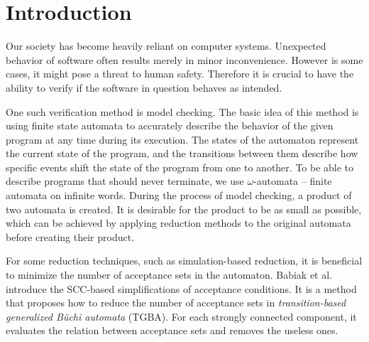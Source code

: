 \documentclass[
  digital, %
  twoside, %
  table,   %
  lof,     %
  lot,     %
]{fithesis3}
\begin{document}

\newcommand{\accmarkblue}{\begin{tikzpicture} \node[accset, collacc0] {}; \end{tikzpicture}}
\newcommand{\accmarkmag}{\begin{tikzpicture} \node[accset, collacc1] {}; \end{tikzpicture}}
\newcommand{\accmarkor}{\begin{tikzpicture} \node[accset, collacc2] {}; \end{tikzpicture}}
\newcommand{\accsquare}{\begin{tikzpicture} \node[accset, collacc0] {}; \end{tikzpicture}}

\chapter{Introduction}
Our society has become heavily reliant on computer systems. Unexpected behavior of software often results merely in minor inconvenience. However is some cases, it might pose a threat to human safety. Therefore it is crucial to have the ability to verify if the software in question behaves as intended. 

One such verification method is model checking. The basic idea of this method is using finite state automata to accurately describe the behavior of the given program at any time during its execution. The states of the automaton represent the current state of the program, and the transitions between them describe how specific events shift the state of the program from one to another. To be able to describe programs that should never terminate, we use $\omega$-automata -- finite automata on infinite words. During the process of model checking, a product of two automata is created. It is desirable for the product to be as small as possible, which can be achieved by applying reduction methods to the original automata before creating their product.

For some reduction techniques, such as simulation-based reduction, it is beneficial to minimize the number of acceptance sets in the automaton. Babiak et al. \cite{spin2013} introduce the SCC-based simplifications of acceptance conditions. It is a method that proposes how to reduce the number of acceptance sets in \emph{transition-based generalized Büchi automata} (TGBA). For each strongly connected component, it evaluates the relation between acceptance sets and removes the useless ones. 
\end{document}

